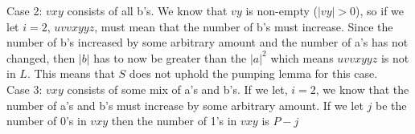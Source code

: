 \documentclass[11pt]{article}
\theoremstyle{definition}
\theoremstyle{theorem}
\begin{document}
\begin{enumerate}[label=(\alph*)]
\begin{enumerate}[label=(\alph*)]
Case 2: $vxy$ consists of all b's. We know that $vy$ is non-empty ($|vy| > 0$), so if we let $i = 2$, $uvvxyyz$, must mean that the number of b's must increase. Since the number of b's increased by some arbitrary amount and the number of a's has not changed, then $|b|$ has to now be greater than the $|a|^2$ which means $uvvxyyz$ is not in $L$. This means that $S$ does not uphold the pumping lemma for this case. \\

Case 3: $vxy$ consists of some mix of a's and b's. If we let, $i = 2$, we know that the number of a's and b's must increase by some arbitrary amount.  If we let $j$ be the number of 0's in $vxy$ then the number of 1's in $vxy$ is $P - j$
\end{enumerate}



\end{enumerate}
\end{document}
